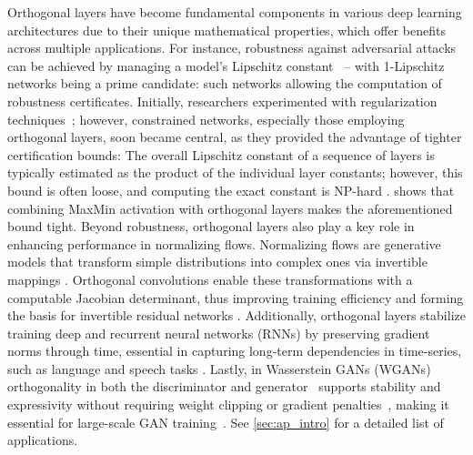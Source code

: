 


Orthogonal layers have become fundamental components in various deep learning architectures due to their unique mathematical properties, which offer benefits across multiple applications. 
For instance, robustness against adversarial attacks can be achieved by managing a model’s Lipschitz constant~\cite{szegedy_intriguing_2013} -- with 1-Lipschitz networks being a prime candidate: such networks allowing the computation of robustness certificates. 
Initially, researchers experimented with regularization techniques~\cite{cisse2017parseval}; however, constrained networks, especially those employing orthogonal layers, soon became central, as they provided the advantage of tighter certification bounds: The overall Lipschitz constant of a sequence of layers is typically estimated as the product of the individual layer constants; however, this bound is often loose, and computing the exact constant is NP-hard \cite{virmaux2018lipschitz}. \cite{anil_sorting_2019} 
shows that combining MaxMin activation with orthogonal layers makes the aforementioned bound tight.
Beyond robustness, orthogonal layers also play a key role in enhancing performance in normalizing flows. Normalizing flows are generative models that transform simple distributions into complex ones via invertible mappings \cite{dinh2016density, rezende2015variational}.  Orthogonal convolutions enable these transformations with a computable Jacobian determinant, thus improving training efficiency \cite{kingma2018glow} and forming the basis for invertible residual networks \cite{behrmann2019invertible}.
Additionally, orthogonal layers stabilize training deep and recurrent neural networks (RNNs) by preserving gradient norms through time, essential in capturing long-term dependencies in time-series, such as language and speech tasks \cite{kiani_projunn_2022,qi_deep_isometric_2020, bansal2018gainorthogonalityregularizationstraining}. Lastly, in Wasserstein GANs (WGANs) \cite{arjovsky2017wasserstein} orthogonality in both the discriminator and generator~\cite{muller2019orthogonal} supports stability and expressivity without requiring weight clipping or gradient penalties~\cite{gulrajani2017improved}, making it essential for large-scale GAN training~\cite{brock2018large, miyato2018spectral}.
See \cref{sec:ap_intro} for a detailed list of applications.


